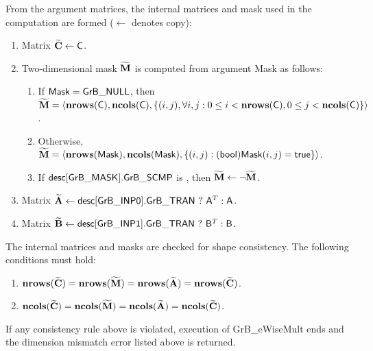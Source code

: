From the argument matrices, the internal matrices and mask used in the computation are formed ($\leftarrow$ denotes copy):
\begin{enumerate}
	\item Matrix ${\bf \widetilde{C}} \leftarrow {\sf C}$.

	\item Two-dimensional mask ${\bf \widetilde{M}}$ is computed from argument {\sf Mask} as follows:
	\begin{enumerate}

		\item	If ${\sf Mask} = {\sf GrB\_NULL}$, then ${\bf \widetilde{M}} = \langle \bold{nrows}({\sf C}), \bold{ncols}({\sf C}), \{(i,j), \forall i,j : 0 \leq i <  \bold{nrows}({\sf C}), 0 \leq j < \bold{ncols}({\sf C}) \} \rangle$.

		\item	Otherwise, ${\bf \widetilde{M}} = \langle \bold{nrows}({\sf Mask}), \bold{ncols}({\sf Mask}), \{(i,j) : ({\sf bool}){\sf Mask}(i,j) = {\sf true}\} \rangle$.

		\item	If ${\sf desc[GrB\_MASK].GrB\_SCMP}$ is \true, then ${\bf \widetilde{M}} \leftarrow \neg {\bf \widetilde{M}}$.

	\end{enumerate}

	\item Matrix ${\bf \widetilde{A}} \leftarrow {\sf desc[GrB\_INP0].GrB\_TRAN} \ ? \ {\sf A}^T : {\sf A}$.

	\item Matrix ${\bf \widetilde{B}} \leftarrow {\sf desc[GrB\_INP1].GrB\_TRAN} \ ? \ {\sf B}^T : {\sf B}$.
\end{enumerate}

The internal matrices and masks are checked for shape consistency. The following conditions must hold:
\begin{enumerate}	
	\item $\bold{nrows}({\bf \widetilde{C}}) = \bold{nrows}({\bf \widetilde{M}})
	     = \bold{nrows}({\bf \widetilde{A}}) = \bold{nrows}({\bf \widetilde{C}})$.

	\item $\bold{ncols}({\bf \widetilde{C}}) = \bold{ncols}({\bf \widetilde{M}})
	     = \bold{ncols}({\bf \widetilde{A}}) = \bold{ncols}({\bf \widetilde{C}})$.
\end{enumerate}
If any consistency rule above is violated, execution of {\sf GrB\_eWiseMult} ends and the dimension mismatch error listed above is returned.

